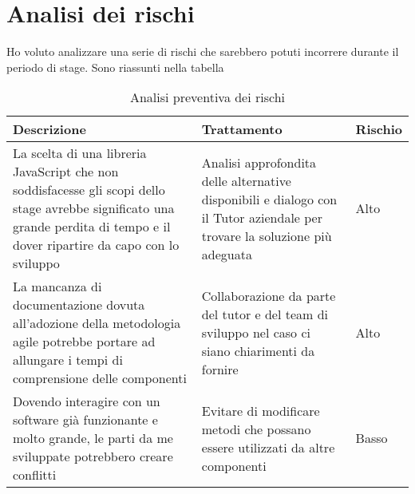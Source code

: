 \newpage
\section {Analisi dei rischi}
Ho voluto analizzare una serie di rischi che sarebbero potuti incorrere durante il periodo di stage. Sono riassunti nella tabella\\ %

\begin{table}[h] %
	\centering
	\caption{Analisi preventiva dei rischi}
	\label{tab:analisi-dei-rischi}
	\begin{tabular}{|p{6cm}|p{}|p{}|}
		\hline
		\rule[-4mm]{0mm}{1cm}
		\textbf{Descrizione} & \textbf{Trattamento} & \textbf{Rischio}\\
		\hline
		La scelta di una libreria JavaScript che non soddisfacesse gli scopi dello stage avrebbe significato una grande perdita di tempo e il dover ripartire da capo con lo sviluppo & Analisi approfondita delle alternative disponibili e dialogo con il Tutor aziendale per trovare la soluzione più adeguata & Alto\\
		\hline
		La mancanza di documentazione dovuta all'adozione della metodologia agile potrebbe portare ad allungare i tempi di comprensione delle componenti & Collaborazione da parte del tutor e del team di sviluppo nel caso ci siano chiarimenti da fornire & Alto\\
		\hline
		Dovendo interagire con un software già funzionante e molto grande, le parti da me sviluppate potrebbero creare conflitti & Evitare di modificare metodi che possano essere utilizzati da altre componenti & Basso\\
		\hline
		
	\end{tabular}
\end{table}
\newpage
\cleardoublepage
